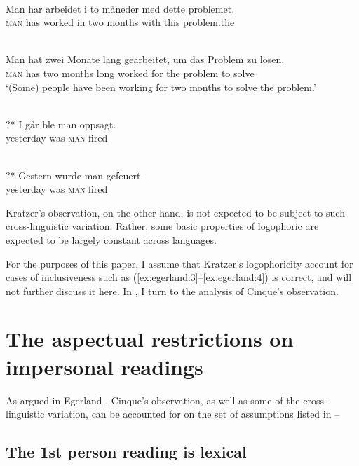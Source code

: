 \documentclass[output=paper]{LSP/langsci}
\begin{document}
\ea\label{ex:egerland:17}
\\
\gll  Man  har  arbeidet  i  to    måneder    med  dette  problemet.\\
\textsc{man}  has  worked  in  two  months    with  this  problem.the\\
\z

\ea\label{ex:egerland:18}
\\
\gll Man  hat  zwei  Monate  lang  gearbeitet,  um  das  Problem  zu  lösen.\\
\textsc{man}  has  two  months  long  worked    for    the  problem  to  solve\\
\glt ‘(Some) people have been working for two months to solve the problem.’
\z

\ea\label{ex:egerland:19}
\\
\gll ?* {I går}    ble  man  oppsagt.\\
{} yesterday  was  \textsc{man}  fired\\
\z

\ea\label{ex:egerland:20}
\\
\gll ?* Gestern  wurde  man  gefeuert.\\
   {} yesterday  was    \textsc{man}  fired\\
\z

Kratzer’s observation, on the other hand, is not expected to be subject to such cross-linguistic variation. Rather, some basic properties of logophoric  are expected to be largely constant across languages.

For the purposes of this paper, I assume that Kratzer’s logophoricity account for cases of inclusiveness such as (\ref{ex:egerland:3}--\ref{ex:egerland:4}) is correct, and will not further discuss it here. In , I turn to the analysis of Cinque’s observation.

\section{The aspectual restrictions on impersonal readings}\label{sec:egerland:3}

As argued in Egerland \citeyear*{Egerland2003romance,Egerland2005}, Cinque’s observation, as well as some of the cross-linguistic variation, can be accounted for on the set of assumptions listed in  -- 

\subsection{The 1st person reading is lexical}\label{sec:egerland:3.1}
\end{document}
